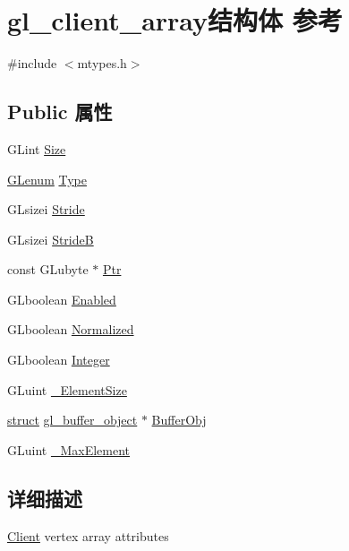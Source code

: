 \hypertarget{structgl__client__array}{}\section{gl\+\_\+client\+\_\+array结构体 参考}
\label{structgl__client__array}


{\ttfamily \#include $<$mtypes.\+h$>$}

\subsection*{Public 属性}
\begin{DoxyCompactItemize}
\item 
G\+Lint \hyperlink{structgl__client__array_aac6bb5e2ee1708c7f6a34bade8b49bfd}{Size}
\item 
\hyperlink{interfacevoid}{G\+Lenum} \hyperlink{structgl__client__array_acdceb166f57a7d950def8ab213a0df06}{Type}
\item 
G\+Lsizei \hyperlink{structgl__client__array_a0f60f949150b164168a786a75a75c282}{Stride}
\item 
G\+Lsizei \hyperlink{structgl__client__array_a30ed459ae4889930d0bc2bfa8a993cd2}{StrideB}
\item 
const G\+Lubyte $\ast$ \hyperlink{structgl__client__array_a129b8c20c0ebd2c24cd7cf5f53969e91}{Ptr}
\item 
G\+Lboolean \hyperlink{structgl__client__array_ad9553c9b1a0009498ff6f45c7fa6196d}{Enabled}
\item 
G\+Lboolean \hyperlink{structgl__client__array_ad70cbe7c87488daa4f598769916fc112}{Normalized}
\item 
G\+Lboolean \hyperlink{structgl__client__array_a9f83bab55d08b4b335be9d94901f59f1}{Integer}
\item 
G\+Luint \hyperlink{structgl__client__array_a818fc9649e9fdd855dcef0017412e17d}{\+\_\+\+Element\+Size}
\item 
\hyperlink{interfacestruct}{struct} \hyperlink{structgl__buffer__object}{gl\+\_\+buffer\+\_\+object} $\ast$ \hyperlink{structgl__client__array_a7d8ac4a2b05226325a195022ceeb7d83}{Buffer\+Obj}
\item 
G\+Luint \hyperlink{structgl__client__array_a0b4e655791ebb6f88f0854cc9ff49725}{\+\_\+\+Max\+Element}
\end{DoxyCompactItemize}


\subsection{详细描述}
\hyperlink{struct_client}{Client} vertex array attributes 

